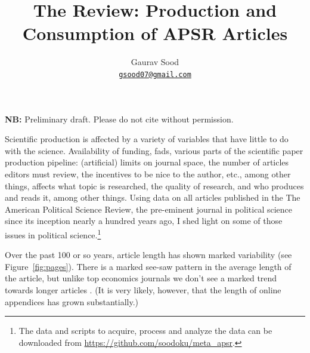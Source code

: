 \documentclass[11pt]{article}
\begin{document}
\title{\vspace{-1cm}\normalsize{\textbf{The Review: Production and Consumption of APSR Articles}}}
\author{Gaurav Sood\\\small{\href{mailto:gsood07@gmail.com}{\tt{gsood07@gmail.com}}}}
\maketitle
\begin{center}
\vspace{-.5cm}\textbf{NB:} Preliminary draft. Please do not cite without permission.
\end{center}
\vspace{.2cm}
\doublespacing

Scientific production is affected by a variety of variables that have little to do with the science. Availability of funding, fads, various parts of the scientific paper production pipeline: (artificial) limits on journal space, the number of articles editors must review, the incentives to be nice to the author, etc., among other things, affects what topic is researched, the quality of research, and who produces and reads it, among other things. Using data on all articles published in the The American Political Science Review, the pre-eminent journal in political science since its inception nearly a hundred years ago, I shed light on some of those issues in political science.\footnote{The data and scripts to acquire, process and analyze the data can be downloaded from \href{https://github.com/soodoku/meta_apsr}{https://github.com/soodoku/meta\_apsr}.} 

Over the past 100 or so years, article length has shown marked variability (see Figure~\ref{fig:pages}). There is a marked see-saw pattern in the average length of the article, but unlike top economics journals we don't see a marked trend towards longer articles \citep{card2013nine, card2014page}. (It is very likely, however, that the length of online appendices has grown substantially.)
\end{document}
